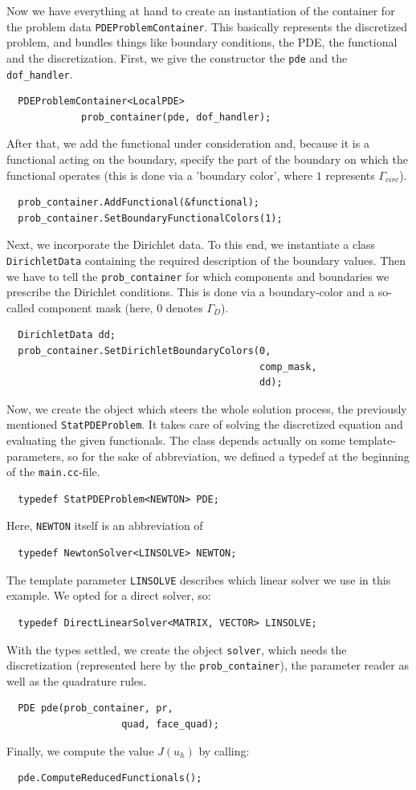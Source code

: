 \documentclass[smallextended]{svjour3}       %
\numberwithin{equation}{section}
\begin{document}
Now we have everything at hand to create an instantiation of the container for the problem data \texttt{PDEProblemContainer}. This basically represents the discretized problem, and bundles things like boundary conditions, the PDE, the functional and the discretization. First, we give the constructor the \texttt{pde} and the \texttt{dof\_handler}.
\begin{lstlisting}
  PDEProblemContainer<LocalPDE> 
             prob_container(pde, dof_handler);                                            
\end{lstlisting}
After that, we add the functional under consideration and, because it is a 
functional acting on the boundary, specify the part of the boundary on which 
the functional operates (this is done via a 'boundary color', where $1$ 
represents $\Gamma_{circ}$).
\begin{lstlisting}
  prob_container.AddFunctional(&functional);
  prob_container.SetBoundaryFunctionalColors(1);
\end{lstlisting}
Next, we incorporate the Dirichlet data. To this end, we instantiate a 
class \texttt{DirichletData} containing the required description of the 
boundary values. Then we have to tell the \texttt{prob\_container} for
which components and boundaries we prescribe the Dirichlet conditions. This is
done via a boundary-color and a so-called component mask 
(here, $0$ denotes $\Gamma_D$).
\begin{lstlisting}
  DirichletData dd;
  prob_container.SetDirichletBoundaryColors(0,
                                            comp_mask,
                                            dd);
\end{lstlisting}
Now, we create the object which steers the whole solution process, the previously mentioned \texttt{StatPDEProblem}. It takes care of solving the discretized equation and evaluating the given functionals. The class depends actually on some template-parameters, so for the sake of abbreviation, we defined a typedef at the beginning of the \texttt{main.cc}-file.
\begin{lstlisting}
  typedef StatPDEProblem<NEWTON> PDE;
\end{lstlisting}
Here, \texttt{NEWTON} itself is an abbreviation of
\begin{lstlisting}
  typedef NewtonSolver<LINSOLVE> NEWTON;
\end{lstlisting}
The  template parameter \texttt{LINSOLVE} describes which linear solver we use in this example. We opted for a direct solver, so: 
\begin{lstlisting}
  typedef DirectLinearSolver<MATRIX, VECTOR> LINSOLVE;
\end{lstlisting}
With the types settled, we create the object \texttt{solver}, which needs the discretization (represented here by the \texttt{prob\_container}), the parameter reader as well as the quadrature rules.
\begin{lstlisting}
  PDE pde(prob_container, pr,
                    quad, face_quad);
\end{lstlisting}
Finally, we compute the value $J(u_h)$ by calling:
\begin{lstlisting}
  pde.ComputeReducedFunctionals();
\end{lstlisting}
\end{document}
